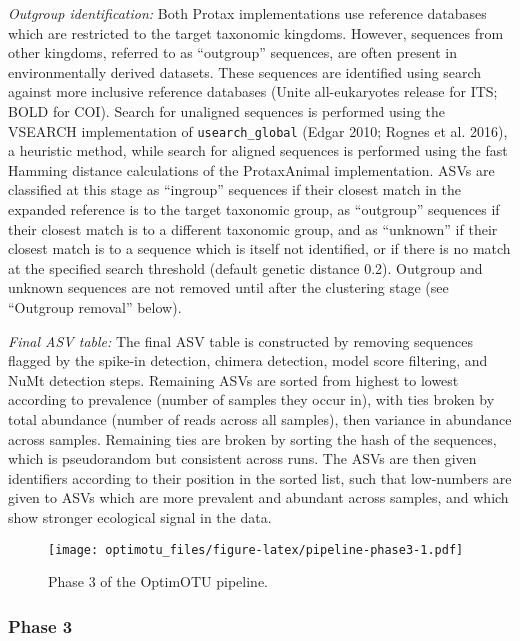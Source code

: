\documentclass[
]{article}
\begin{document}
\emph{Outgroup identification:}
Both Protax implementations use reference databases which are restricted to the target taxonomic kingdoms.
However, sequences from other kingdoms, referred to as ``outgroup'' sequences, are often present in environmentally derived datasets.
These sequences are identified using search against more inclusive reference databases (Unite all-eukaryotes release for ITS; BOLD for COI).
Search for unaligned sequences is performed using the VSEARCH implementation of \texttt{usearch\_global} (Edgar 2010; Rognes et al. 2016), a heuristic method, while search for aligned sequences is performed using the fast Hamming distance calculations of the ProtaxAnimal implementation.
ASVs are classified at this stage as ``ingroup'' sequences if their closest match in the expanded reference is to the target taxonomic group, as ``outgroup'' sequences if their closest match is to a different taxonomic group, and as ``unknown'' if their closest match is to a sequence which is itself not identified, or if there is no match at the specified search threshold (default genetic distance 0.2).
Outgroup and unknown sequences are not removed until after the clustering stage (see ``Outgroup removal'' below).

\emph{Final ASV table:}
The final ASV table is constructed by removing sequences flagged by the spike-in detection, chimera detection, model score filtering, and NuMt detection steps.
Remaining ASVs are sorted from highest to lowest according to prevalence (number of samples they occur in), with ties broken by total abundance (number of reads across all samples), then variance in abundance across samples.
Remaining ties are broken by sorting the hash of the sequences, which is pseudorandom but consistent across runs.
The ASVs are then given identifiers according to their position in the sorted list, such that low-numbers are given to ASVs which are more prevalent and abundant across samples, and which show stronger ecological signal in the data.

\begin{figure}
\centering
\texttt{[image: optimotu\_files/figure-latex/pipeline-phase3-1.pdf]}
\caption{\label{fig:pipeline-phase3}Phase 3 of the OptimOTU pipeline.}
\end{figure}

\subsubsection{Phase 3}\label{phase-3}
\end{document}
